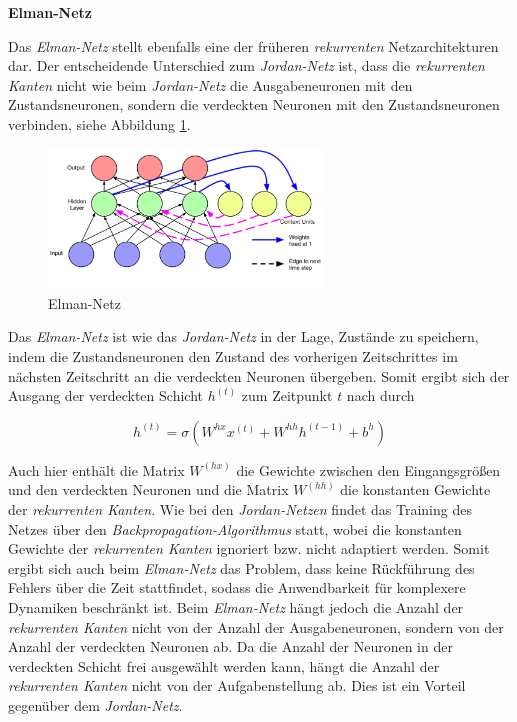 \textbf{Elman-Netz}

Das \textit{Elman-Netz} stellt ebenfalls eine der früheren \textit{rekurrenten} Netzarchitekturen dar. Der entscheidende Unterschied zum \textit{Jordan-Netz} ist, dass die \textit{rekurrenten Kanten} nicht wie beim \textit{Jordan-Netz} die Ausgabeneuronen mit den Zustandsneuronen, sondern die verdeckten Neuronen mit den Zustandsneuronen verbinden, siehe Abbildung \ref{fig:elman}.

\begin{figure} [h]
	\centering
	\includegraphics[width=0.65\textwidth]{images/elman}
	\caption{Elman-Netz \cite{Lipton.5292015}}
	\label{fig:elman}
\end{figure}

Das \textit{Elman-Netz} ist wie das \textit{Jordan-Netz} in der Lage, Zustände zu speichern, indem die Zustandsneuronen den Zustand des vorherigen Zeitschrittes im nächsten Zeitschritt an die verdeckten Neuronen übergeben. Somit ergibt sich der Ausgang der verdeckten Schicht $h^{(t)}$ zum Zeitpunkt $t$ nach \cite{Elman.1990} durch 

\begin{equation}
h^{(t)} = \sigma(W^{hx}x^{(t)} + W^{hh}h^{(t-1)} + b^{h})
\end{equation}

Auch hier enthält die Matrix $W^{(hx)}$ die Gewichte zwischen den Eingangsgrößen und den verdeckten Neuronen und die Matrix $W^{(hh)}$ die konstanten Gewichte der \textit{rekurrenten Kanten}.
Wie bei den \textit{Jordan-Netzen} findet das Training des Netzes über den \textit{Backpropagation-Algorithmus} statt, wobei die konstanten Gewichte der \textit{rekurrenten Kanten} ignoriert bzw. nicht adaptiert werden. 
Somit ergibt sich auch beim \textit{Elman-Netz} das Problem, dass keine Rückführung des Fehlers über die Zeit stattfindet, sodass die Anwendbarkeit für komplexere Dynamiken beschränkt ist. Beim \textit{Elman-Netz} hängt jedoch die Anzahl der \textit{rekurrenten Kanten} nicht von der Anzahl der Ausgabeneuronen, sondern von der Anzahl der verdeckten Neuronen ab. Da die Anzahl der Neuronen in der verdeckten Schicht frei ausgewählt werden kann, hängt die Anzahl der \textit{rekurrenten Kanten} nicht von der Aufgabenstellung ab. Dies ist ein Vorteil gegenüber dem \textit{Jordan-Netz}.

 


 
